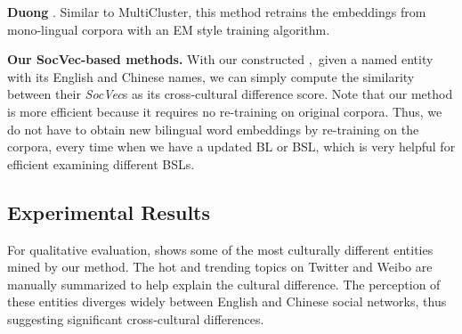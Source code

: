 \noindent\textbf{Duong}
\cite{duong2016learning}. 
Similar to MultiCluster, this method retrains the embeddings from 
mono-lingual corpora with an EM style training algorithm. 

\noindent\textbf{Our SocVec-based methods.}  With our constructed \textit{\socvec},~given a named entity with its English and Chinese names, we can simply compute the similarity between their \textit{SocVec}s as its cross-cultural difference score. 
Note that our method is more efficient because it requires no re-training on original corpora. Thus, we do not have to obtain new bilingual word embeddings by re-training on the corpora, every time when we have a updated BL or BSL, which is very helpful for efficient examining different BSLs.


\subsection{Experimental Results}

For qualitative evaluation,  shows some of 
the most culturally different entities mined by our method. 
The hot and trending topics on Twitter and Weibo are 
manually summarized to help explain the cultural difference. 
The perception of these entities diverges widely between English and
Chinese social networks, thus suggesting
significant cross-cultural differences.


